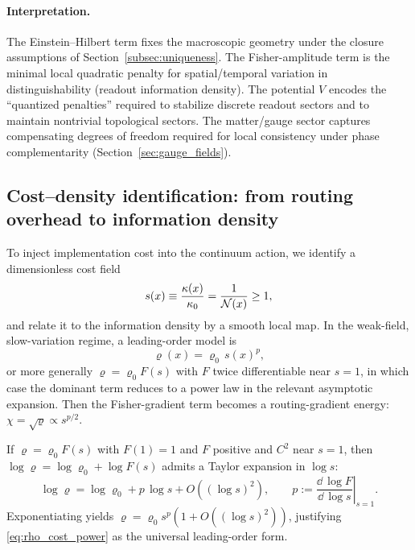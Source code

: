 \paragraph{Interpretation.}
The Einstein--Hilbert term fixes the macroscopic geometry under the closure assumptions of Section~\ref{subsec:uniqueness}. The Fisher-amplitude term is the minimal local quadratic penalty for spatial/temporal variation in distinguishability (readout information density). The potential $V$ encodes the ``quantized penalties'' required to stabilize discrete readout sectors and to maintain nontrivial topological sectors. The matter/gauge sector captures compensating degrees of freedom required for local consistency under phase complementarity (Section~\ref{sec:gauge_fields}).

\subsection{Cost--density identification: from routing overhead to information density}
\label{subsec:cost_density}

To inject implementation cost into the continuum action, we identify a dimensionless cost field
\begin{equation}
  s(x) \equiv \frac{\kappa(x)}{\kappa_0} = \frac{1}{\mathcal{N}(x)} \ge 1,
\end{equation}
and relate it to the information density by a smooth local map. In the weak-field, slow-variation regime, a leading-order model is
\begin{equation}
\label{eq:rho_cost_power}
  \varrho(x) = \varrho_{0}\, s(x)^{p},
\end{equation}
or more generally $\varrho=\varrho_{0}F(s)$ with $F$ twice differentiable near $s=1$, in which case the dominant term reduces to a power law in the relevant asymptotic expansion. Then the Fisher-gradient term becomes a routing-gradient energy: $\chi=\sqrt{\varrho}\propto s^{p/2}$.

\begin{remark}
If $\varrho=\varrho_0 F(s)$ with $F(1)=1$ and $F$ positive and $C^2$ near $s=1$, then $\log \varrho = \log \varrho_0 + \log F(s)$ admits a Taylor expansion in $\log s$:
\begin{equation}
  \log \varrho = \log \varrho_0 + p\,\log s + O\!\left((\log s)^2\right),
  \qquad
  p := \left.\frac{\dd\,\log F}{\dd\,\log s}\right|_{s=1}.
\end{equation}
Exponentiating yields $\varrho=\varrho_0 s^p\left(1+O\!\left((\log s)^2\right)\right)$, justifying \eqref{eq:rho_cost_power} as the universal leading-order form.
\end{remark}

